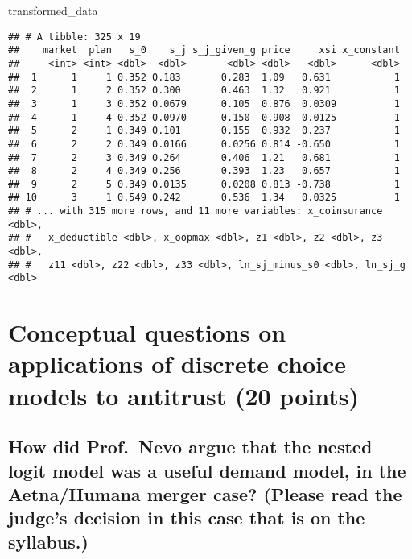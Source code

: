 \documentclass[]{article}
\newenvironment{Shaded}{\begin{snugshade}}{\end{snugshade}}
\newcommand{\NormalTok}[1]{#1}
\begin{document}
\begin{Shaded}
\begin{Highlighting}[]
\NormalTok{transformed_data}
\end{Highlighting}
\end{Shaded}

\begin{verbatim}
## # A tibble: 325 x 19
##    market  plan   s_0    s_j s_j_given_g price     xsi x_constant
##     <int> <int> <dbl>  <dbl>       <dbl> <dbl>   <dbl>      <dbl>
##  1      1     1 0.352 0.183       0.283  1.09   0.631           1
##  2      1     2 0.352 0.300       0.463  1.32   0.921           1
##  3      1     3 0.352 0.0679      0.105  0.876  0.0309          1
##  4      1     4 0.352 0.0970      0.150  0.908  0.0125          1
##  5      2     1 0.349 0.101       0.155  0.932  0.237           1
##  6      2     2 0.349 0.0166      0.0256 0.814 -0.650           1
##  7      2     3 0.349 0.264       0.406  1.21   0.681           1
##  8      2     4 0.349 0.256       0.393  1.23   0.657           1
##  9      2     5 0.349 0.0135      0.0208 0.813 -0.738           1
## 10      3     1 0.549 0.242       0.536  1.34   0.0325          1
## # ... with 315 more rows, and 11 more variables: x_coinsurance <dbl>,
## #   x_deductible <dbl>, x_oopmax <dbl>, z1 <dbl>, z2 <dbl>, z3 <dbl>,
## #   z11 <dbl>, z22 <dbl>, z33 <dbl>, ln_sj_minus_s0 <dbl>, ln_sj_g <dbl>
\end{verbatim}

\hypertarget{conceptual-questions-on-applications-of-discrete-choice-models-to-antitrust-20-points}{%
\section{Conceptual questions on applications of discrete choice models
to antitrust (20
points)}\label{conceptual-questions-on-applications-of-discrete-choice-models-to-antitrust-20-points}}

\hypertarget{how-did-prof.nevo-argue-that-the-nested-logit-model-was-a-useful-demand-model-in-the-aetnahumana-merger-case-please-read-the-judges-decision-in-this-case-that-is-on-the-syllabus.}{%
\subsection{How did Prof.~Nevo argue that the nested logit model was a
useful demand model, in the Aetna/Humana merger case? (Please read the
judge's decision in this case that is on the
syllabus.)}\label{how-did-prof.nevo-argue-that-the-nested-logit-model-was-a-useful-demand-model-in-the-aetnahumana-merger-case-please-read-the-judges-decision-in-this-case-that-is-on-the-syllabus.}}
\end{document}
